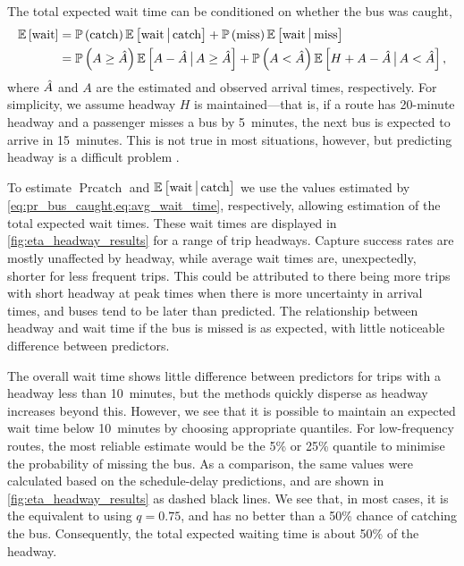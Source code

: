 The total expected wait time can be conditioned on whether the bus was caught,
\begin{equation}
\label{eq:eta_wait_conditional}
\begin{split}
\mathbb{E}\left[\text{wait}\right] &=
  \mathbb{P}\left(\text{catch}\right) \mathbb{E}\left[\text{wait}\,\big|\,{}\text{catch}\right] +
  \mathbb{P}\left(\text{miss}\right) \mathbb{E}\left[\text{wait}\,\big|\,{}\text{miss}\right] \\
  &= \mathbb{P}\left(A \geq \hat{A}\right) \mathbb{E}\left[A - \hat{A} \,\big|\,{} A \geq \hat{A}\right] +
  \mathbb{P}\left(A < \hat{A}\right)\mathbb{E}\left[H + A - \hat{A} \,\big|\,{} A < \hat{A}\right],
\end{split}
\end{equation}
where $\hat{A}$ and $A$ are the estimated and observed arrival times, respectively. For simplicity, we assume headway $H$ is maintained---that is, if a route has 20-minute headway and a passenger misses a bus by 5~minutes, the next bus is expected to arrive in 15~minutes. This is not true in most situations, however, but predicting headway is a difficult problem \citep{Chen_2012,Hans_2014,Hans_2015}.


To estimate $\Pr{\text{catch}}$ and $\mathbb{E}\left[\text{wait}\,\big|\,{}\text{catch}\right]$ we use the values estimated by \cref{eq:pr_bus_caught,eq:avg_wait_time}, respectively, allowing estimation of the total expected wait times. These wait times are displayed in \cref{fig:eta_headway_results} for a range of trip headways. Capture success rates are mostly unaffected by headway, while average wait times are, unexpectedly, shorter for less frequent trips. This could be attributed to there being more trips with short headway at peak times when there is more uncertainty in arrival times, and buses tend to be later than predicted. The relationship between headway and wait time if the bus is missed is as expected, with little noticeable difference between predictors.


The overall wait time shows little difference between predictors for trips with a headway less than 10~minutes, but the methods quickly disperse as headway increases beyond this. However, we see that it is possible to maintain an expected wait time below 10~minutes by choosing appropriate quantiles. For low-frequency routes, the most reliable estimate would be the 5\% or 25\% quantile to minimise the probability of missing the bus. As a comparison, the same values were calculated based on the schedule-delay predictions, and are shown in \cref{fig:eta_headway_results} as dashed black lines. We see that, in most cases, it is the equivalent to using $q=0.75$, and has no better than a 50\% chance of catching the bus. Consequently, the total expected waiting time is about 50\% of the headway.


